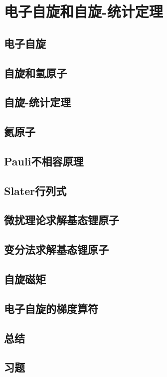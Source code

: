 \chapter{电子自旋和自旋-统计定理}
\label{chap:10}
\section{电子自旋}
\label{sec:10.1 Electron Spin}

\section{自旋和氢原子}
\label{sec:10.2 Spin and the Hydrogen Atom}

\section{自旋-统计定理}
\label{sec:10.3 Spin-Statistics Theorem}

\section{氦原子}
\label{sec:10.4 Th Helium Atom}

\section{Pauli不相容原理}
\label{sec:10.5 The Pauli Exclusion Principle}

\section{Slater行列式}
\label{sec:10.6 Slater Determinants}

\section{微扰理论求解基态锂原子}
\label{sec:10.7 Perturbation Treatment of the Lithium Ground State}

\section{变分法求解基态锂原子}
\label{sec:10.8 Variation Treatments of the Lithium Ground State}

\section{自旋磁矩}
\label{sec:10.9 Spin Magnetic Moment}

\section{电子自旋的梯度算符}
\label{sec:10.10 Ladder Operators for Electron Spin}

\section*{总结}

\section*{习题}